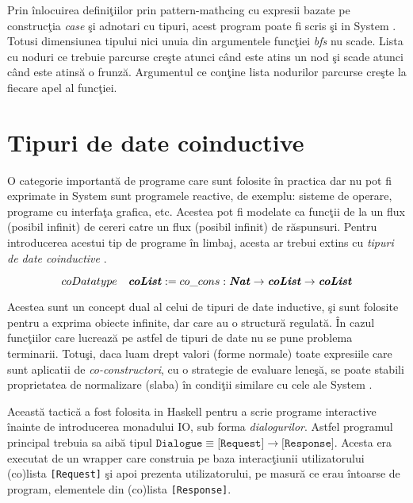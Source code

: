 Prin \^ inlocuirea defini\c tiilor prin pattern-mathcing cu expresii bazate pe construc\c tia \emph{case} \c si adnotari cu tipuri, acest program poate fi scris \c si in System \frec. Totusi dimensiunea tipului nici unuia din argumentele func\c tiei \emph{bfs} nu scade. Lista cu noduri ce trebuie parcurse cre\c ste atunci c\^ and este atins un nod \c si scade atunci c\^ and este atins\u a o frunz\u a. Argumentul ce con\c tine lista nodurilor parcurse cre\c ste la fiecare apel al func\c tiei.
\done{}
\section{Tipuri de date coinductive}
\done{}
O categorie important\u a de programe care sunt folosite \^ in practica dar nu pot fi exprimate in System \fhat sunt programele reactive, de exemplu: sisteme de operare, programe cu interfa\c ta grafica, etc. Acestea pot fi modelate ca func\c tii de la un flux (posibil infinit) de cereri catre un flux (posibil infinit) de r\u aspunsuri. Pentru introducerea acestui tip de programe \^ in limbaj, acesta ar trebui extins cu \emph{tipuri de date coinductive} \citep{citeulike:4023285}.
\begin{example}
$$ coDatatype \quad \textbf{\emph{coList}} := co\_cons : \textbf{\emph{Nat}}\to \textbf{\emph{coList}} \to \textbf{\emph{coList}} $$
\end{example}

Acestea sunt un concept dual al celui de tipuri de date inductive, \c si sunt folosite pentru a exprima obiecte infinite, dar care au o structur\u a regulat\u a. \^ In cazul func\c tiilor care lucreaz\u a pe astfel de tipuri de date nu se pune problema terminarii. Totu\c si, daca luam drept valori (forme normale) toate expresiile care sunt aplicatii de \emph{co-constructori}, cu o strategie de evaluare lene\c s\u a, se poate stabili proprietatea de normalizare (slaba) \^ in condi\c tii similare cu cele ale System \fhat \citep{DBLP:journals/ita/Abel04}.

Aceast\u a tactic\u a a fost folosita in Haskell pentru a scrie programe interactive \^ inainte de introducerea monadului IO, sub forma \emph{dialogurilor}\citep{158524}. Astfel programul principal trebuia sa aib\u a tipul $\texttt{Dialogue} \equiv \texttt{[Request]} \to \texttt{[Response]}$. Acesta era executat de un wrapper care construia pe baza interac\c tiunii utilizatorului (co)lista \texttt{[Request]} \c si apoi prezenta utilizatorului, pe masur\u a ce erau \^ intoarse de program, elementele din (co)lista \texttt{[Response]}.

